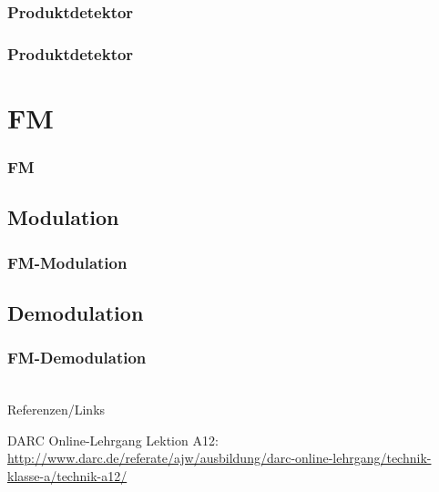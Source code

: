 \subsubsection{Produktdetektor}

\begin{frame}
    \frametitle{Produktdetektor}

\end{frame}

\section{FM}

\begin{frame}
    \frametitle{FM}


\end{frame}

\subsection{Modulation}

\begin{frame}
    \frametitle{FM-Modulation}


\end{frame}

\subsection{Demodulation}

\begin{frame}
    \frametitle{FM-Demodulation}


\end{frame}

\renewcommand{\refname}{Referenzen}

\hypertarget{refs}{}
\textcolor{white}{} \\ %
\Large Referenzen/Links
\footnotesize

\begin{thebibliography}{}
      DARC Online-Lehrgang Lektion A12:
                    \url{http://www.darc.de/referate/ajw/ausbildung/darc-online-lehrgang/technik-klasse-a/technik-a12/}
\end{thebibliography} 



